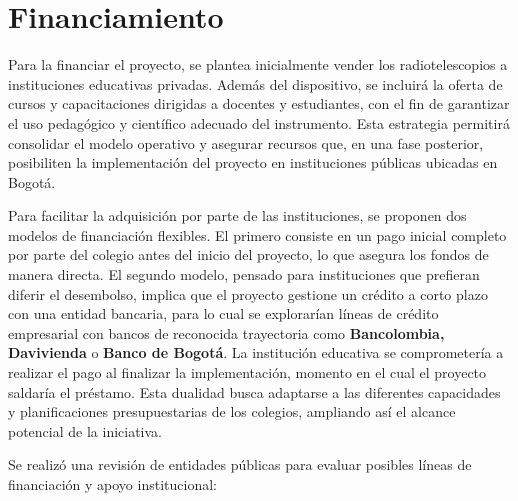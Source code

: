 \section{Financiamiento}%
\label{sec:Financiamiento}

Para la financiar el proyecto, se plantea inicialmente vender los
radiotelescopios a instituciones educativas privadas.
Además del dispositivo, se incluirá la oferta de cursos y capacitaciones
dirigidas a docentes y estudiantes, con el fin de garantizar el uso pedagógico
y científico adecuado del instrumento.
Esta estrategia permitirá consolidar el modelo operativo y asegurar recursos que,
en una fase posterior, posibiliten la implementación del proyecto en
instituciones públicas ubicadas en Bogotá.

Para facilitar la adquisición por parte de las instituciones, se proponen dos
modelos de financiación flexibles. El primero consiste en un pago inicial
completo por parte del colegio antes del inicio del proyecto, lo que asegura
los fondos de manera directa. El segundo modelo, pensado para instituciones
que prefieran diferir el desembolso, implica que el proyecto gestione un
crédito a corto plazo con una entidad bancaria, para lo cual se explorarían
líneas de crédito empresarial con bancos de reconocida trayectoria como
\textbf{Bancolombia, Davivienda} o \textbf{Banco de Bogotá}. La institución educativa se
comprometería a realizar el pago al finalizar la implementación, momento en el
cual el proyecto saldaría el préstamo. Esta dualidad busca adaptarse a las
diferentes capacidades y planificaciones presupuestarias de los colegios,
ampliando así el alcance potencial de la iniciativa.

Se realizó una revisión de entidades públicas para evaluar posibles líneas de
financiación y apoyo institucional:

